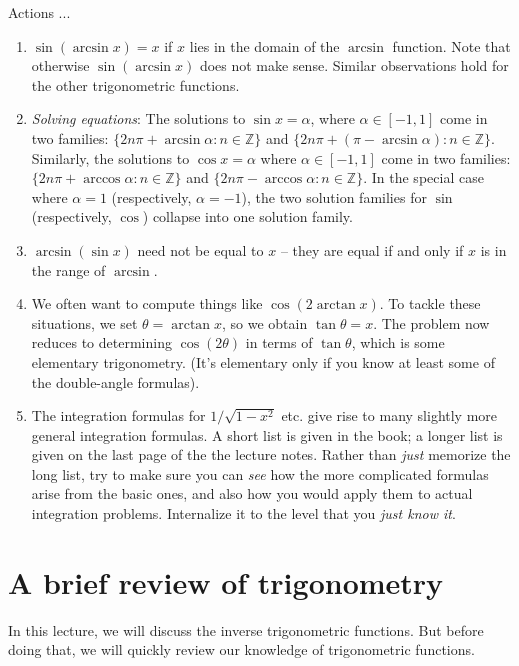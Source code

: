 \documentclass{amsart}
\begin{document}
Actions ...

\begin{enumerate}

\item $\sin(\arcsin x) = x$ if $x$ lies in the domain of the $\arcsin$
  function. Note that otherwise $\sin(\arcsin x)$ does not make
  sense. Similar observations hold for the other trigonometric
  functions.
\item {\em Solving equations}: The solutions to $\sin x = \alpha$,
  where $\alpha \in [-1,1]$ come in two families: $\{ 2n\pi + \arcsin
  \alpha : n \in \mathbb{Z} \}$ and $\{ 2n\pi + (\pi - \arcsin \alpha)
  : n \in \mathbb{Z} \}$. Similarly, the solutions to $\cos x =
  \alpha$ where $\alpha \in [-1,1]$ come in two families: $\{ 2n \pi +
  \arccos \alpha: n \in \mathbb{Z} \}$ and $\{ 2n\pi - \arccos \alpha
  : n \in \mathbb{Z} \}$. In the special case where $\alpha = 1$
  (respectively, $\alpha = -1$), the two solution families for $\sin$
  (respectively, $\cos$) collapse into one solution family.
\item $\arcsin(\sin x)$ need not be equal to $x$ -- they are equal if
  and only if $x$ is in the range of $\arcsin$.
\item We often want to compute things like $\cos(2 \arctan x)$. To
  tackle these situations, we set $\theta = \arctan x$, so we obtain
  $\tan \theta = x$. The problem now reduces to determining
  $\cos(2\theta)$ in terms of $\tan \theta$, which is some elementary
  trigonometry. (It's elementary only if you know at least some of the
  double-angle formulas).
\item The integration formulas for $1/\sqrt{1 - x^2}$ etc. give rise
  to many slightly more general integration formulas. A short list is
  given in the book; a longer list is given on the last page of the
  the lecture notes. Rather than {\em just} memorize the long list,
  try to make sure you can {\em see} how the more complicated formulas
  arise from the basic ones, and also how you would apply them to
  actual integration problems. Internalize it to the level that you
  {\em just know it}.
\end{enumerate}

\section{A brief review of trigonometry}

In this lecture, we will discuss the inverse trigonometric
functions. But before doing that, we will quickly review our knowledge
of trigonometric functions.
\end{document}
